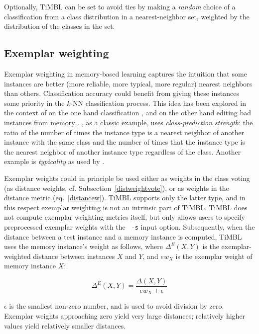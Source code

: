 \documentclass{book}
\begin{document}
Optionally, TiMBL can be set to avoid ties by making a {\em random}\/
choice of a classification from a class distribution in a
nearest-neighbor set, weighted by the distribution of the classes in
the set.

\subsection{Exemplar weighting}
\label{exemplar}

Exemplar weighting in memory-based learning captures the intuition
that some instances are better (more reliable, more typical, more
regular) nearest neighbors than others. Classification accuracy could
benefit from giving these instances some priority in the $k$-NN
classification process. This idea has been explored in the context of
on the one hand classification \cite{Salzberg90,Zhang92}, and on the
other hand editing bad instances from memory
\cite{Aha+91}. , as a classic example, uses {\em
class-prediction strength}: the ratio of the number of times the
instance type is a nearest neighbor of another instance with the same
class and the number of times that the instance type is the nearest
neighbor of another instance type regardless of the class. Another
example is {\em typicality}\/ as used by .

Exemplar weights could in principle be used either as weights in the
class voting (as distance weights,
cf. Subsection~\ref{distweightvote}), or as weights in the distance
metric (eq.~\ref{distancew}). TiMBL supports only the latter type, and
in this respect exemplar weighting is not an intrinsic part of
TiMBL. TiMBL does not compute exemplar weighting metrics itself, but only
allows users to specify preprocessed exemplar weights with the {\tt
-s} input option. Subsequently, when the distance between a test
instance and a memory instance is computed, TiMBL uses the memory
instance's weight as follows, where $\Delta^{E}(X,Y)$ is the
exemplar-weighted distance between instances $X$ and $Y$, and $ew_{X}$
is the exemplar weight of memory instance $X$:

\begin{equation}
\Delta^{E}(X,Y) = \frac{\Delta(X,Y)}{ew_{X} + \epsilon}
\label{exweight}
\end{equation}

$\epsilon$ is the smallest non-zero number, and is used to avoid
division by zero. Exemplar weights approaching zero yield very large
distances; relatively higher values yield relatively smaller
distances.
\end{document}
